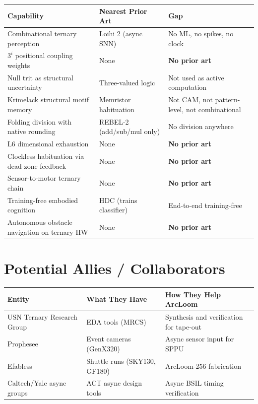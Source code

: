 \documentclass[11pt, a4paper]{article}
\newcommand{\nopriorart}{\textcolor{gap-red}{\textbf{No prior art}}}
\begin{document}
\begin{center}
\begin{longtable}{@{}p{4.5cm}p{4cm}p{5cm}@{}}
\toprule
\textbf{Capability} & \textbf{Nearest Prior Art} & \textbf{Gap} \\
\midrule
\endhead
Combinational ternary perception & Loihi 2 (async SNN) & No ML, no spikes, no clock \\
$3^i$ positional coupling weights & None & \nopriorart \\
Null trit as structural uncertainty & Three-valued logic & Not used as active computation \\
Krimelack structural motif memory & Memristor habituation & Not CAM, not pattern-level, not combinational \\
Folding division with native rounding & REBEL-2 (add/sub/mul only) & No division anywhere \\
L6 dimensional exhaustion & None & \nopriorart \\
Clockless habituation via dead-zone feedback & None & \nopriorart \\
Sensor-to-motor ternary chain & None & \nopriorart \\
Training-free embodied cognition & HDC (trains classifier) & End-to-end training-free \\
Autonomous obstacle navigation on ternary HW & None & \nopriorart \\
\bottomrule
\end{longtable}
\end{center}

\section{Potential Allies / Collaborators}

\begin{center}
\begin{tabular}{@{}lll@{}}
\toprule
\textbf{Entity} & \textbf{What They Have} & \textbf{How They Help ArcLoom} \\
\midrule
USN Ternary Research Group & EDA tools (MRCS) & Synthesis and verification for tape-out \\
Prophesee & Event cameras (GenX320) & Async sensor input for SPPU \\
Efabless & Shuttle runs (SKY130, GF180) & ArcLoom-256 fabrication \\
Caltech/Yale async groups & ACT async design tools & Async BSIL timing verification \\
\bottomrule
\end{tabular}
\end{center}
\end{document}
